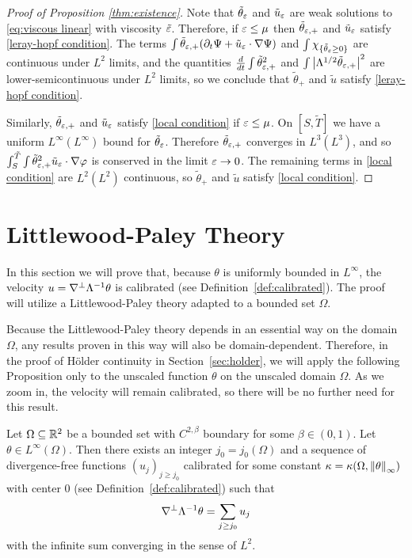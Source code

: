 \begin{proof}[Proof of Proposition \ref{thm:existence}]
Note that $\tilde{\theta}_\varepsilon$ and $\tilde{u}_\varepsilon$ are weak solutions to \eqref{eq:viscous linear} with viscosity $\tilde{\varepsilon}$.  Therefore, if $\varepsilon \leq \mu$ then $\tilde{\theta}_{\varepsilon,+}$ and $\tilde{u}_\varepsilon$ satisfy \eqref{leray-hopf condition}.  The terms $\int \tilde{\theta}_{\varepsilon,+} (\partial_t\Psi+\tilde{u}_\varepsilon\cdot\nabla\Psi)$ and $\int \chi_{\{\tilde{\theta}_\varepsilon \geq 0\}}$ are continuous under $L^2$ limits, and the quantities $\frac{d}{dt} \int \tilde{\theta}_{\varepsilon,+}^2$ and $\int \left\lvert \Lambda^{1/2} \tilde{\theta}_{\varepsilon,+} \right\rvert^2$ are lower-semicontinuous under $L^2$ limits, so we conclude that $\tilde{\theta}_+$ and $\tilde{u}$ satisfy \eqref{leray-hopf condition}.  

Similarly, $\tilde{\theta}_{\varepsilon,+}$ and $\tilde{u}_\varepsilon$ satisfy \eqref{local condition} if $\varepsilon \leq \mu$.  On $[S, \tilde{T}]$ we have a uniform $L^\infty(L^\infty)$ bound for $\tilde{\theta}_\varepsilon$. Therefore $\tilde{\theta}_{\varepsilon,+}$ converges in $L^3(L^3)$, and so $\int_S^{\tilde{T}}\int \tilde{\theta}_{\varepsilon,+}^2 \tilde{u}_\varepsilon\cdot\nabla\varphi$ is conserved in the limit $\varepsilon \to 0$.  The remaining terms in \eqref{local condition} are $L^2(L^2)$ continuous, so $\tilde{\theta}_+$ and $\tilde{u}$ satisfy \eqref{local condition}.  
\end{proof}


\vskip1cm
\section{Littlewood-Paley Theory} \label{sec:littlewood paley}

In this section we will prove that, because $\theta$ is uniformly bounded in $L^\infty$, the velocity $u = \nabla^\perp \Lambda^{-1} \theta$ is calibrated (see Definition~\ref{def:calibrated}).  The proof will utilize a Littlewood-Paley theory adapted to a bounded set $\Omega$.  

Because the Littlewood-Paley theory depends in an essential way on the domain $\Omega$, any results proven in this way will also be domain-dependent.  Therefore, in the proof of H\"{o}lder continuity in Section~\ref{sec:holder}, we will apply the following Proposition only to the unscaled function $\theta$ on the unscaled domain $\Omega$.  As we zoom in, the velocity will remain calibrated, so there will be no further need for this result.  

\begin{proposition} \label{thm:u is calibrated}
Let $\Omega \subseteq \mathbb{R}^2$ be a bounded set with $C^{2,\beta}$ boundary for some $\beta \in (0,1)$.  Let $\theta \in L^\infty(\Omega)$.  Then there exists an integer $j_0 = j_0(\Omega)$ and a sequence of divergence-free functions $(u_j)_{j \geq j_0}$ calibrated for some constant $\kappa = \kappa(\Omega, \left\lVert\theta\right\rVert_\infty)$ with center 0 (see Definition~\ref{def:calibrated}) such that
\[ \nabla^\perp \Lambda^{-1} \theta = \sum_{j \geq j_0} u_j \]
with the infinite sum converging in the sense of $L^2$.  
\end{proposition}

